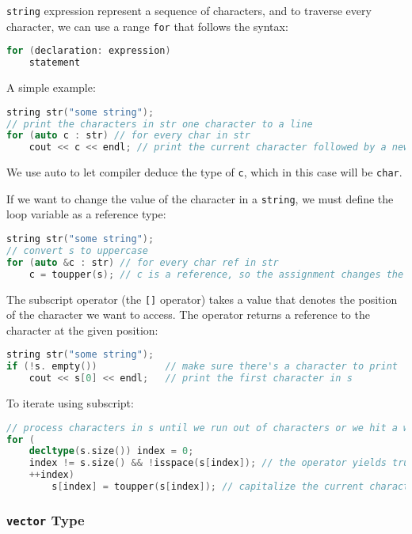 \texttt{string} expression represent a sequence of characters, and to traverse every character, we can use a range \texttt{for} that follows the syntax:
\begin{lstlisting}[language=C++]
for (declaration: expression)
    statement
\end{lstlisting}

A simple example:
\begin{lstlisting}[language=C++]
string str("some string"); 
// print the characters in str one character to a line 
for (auto c : str) // for every char in str 
    cout << c << endl; // print the current character followed by a newline
\end{lstlisting}
We use auto to let compiler deduce the type of \texttt{c}, which in this case will be \texttt{char}.

If we want to change the value of the character in a \texttt{string}, we must define the loop variable as a reference type:
\begin{lstlisting}[language=C++]
string str("some string"); 
// convert s to uppercase 
for (auto &c : str) // for every char ref in str 
    c = toupper(s); // c is a reference, so the assignment changes the char in s
\end{lstlisting}

The subscript operator (the \texttt{[]} operator) takes a  value that denotes the position of the character we want to access. The operator returns a reference to the character at the given position:
\begin{lstlisting}[language=C++]
string str("some string"); 
if (!s. empty())            // make sure there's a character to print
    cout << s[0] << endl;   // print the first character in s
\end{lstlisting}

To iterate using subscript:
\begin{lstlisting}[language=C++]
// process characters in s until we run out of characters or we hit a whitespace 
for (
    decltype(s.size()) index = 0; 
    index != s.size() && !isspace(s[index]); // the operator yields true if both operands are true
    ++index) 
        s[index] = toupper(s[index]); // capitalize the current character
\end{lstlisting}

\subsubsection{\texttt{vector} Type}

